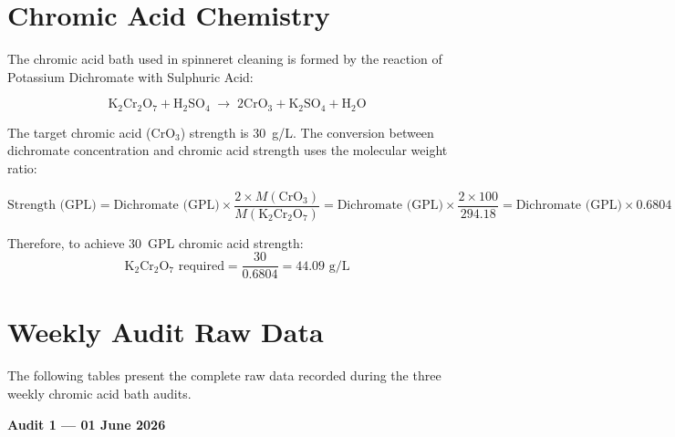 \documentclass{book}
\begin{document}
\begin{appendices}

\chapter{Chromic Acid Chemistry}

The chromic acid bath used in spinneret cleaning is formed by the reaction of Potassium Dichromate with Sulphuric Acid:

\begin{equation}
  \text{K}_2\text{Cr}_2\text{O}_7 + \text{H}_2\text{SO}_4 \;\longrightarrow\; 2\text{CrO}_3 + \text{K}_2\text{SO}_4 + \text{H}_2\text{O}
\end{equation}

The target chromic acid (CrO$_3$) strength is 30~g/L. The conversion between dichromate concentration and chromic acid strength uses the molecular weight ratio:

\begin{equation}
  \text{Strength (GPL)} = \text{Dichromate (GPL)} \times \frac{2 \times M(\text{CrO}_3)}{M(\text{K}_2\text{Cr}_2\text{O}_7)}
  = \text{Dichromate (GPL)} \times \frac{2 \times 100}{294.18} = \text{Dichromate (GPL)} \times 0.6804
\end{equation}

Therefore, to achieve 30~GPL chromic acid strength:
\begin{equation}
  \text{K}_2\text{Cr}_2\text{O}_7 \text{ required} = \frac{30}{0.6804} = 44.09 \text{ g/L}
\end{equation}

\chapter{Weekly Audit Raw Data}
\label{appB}

The following tables present the complete raw data recorded during the three weekly chromic acid bath audits.

\textbf{Audit 1 --- 01 June 2026}


\end{appendices}
\end{document}

